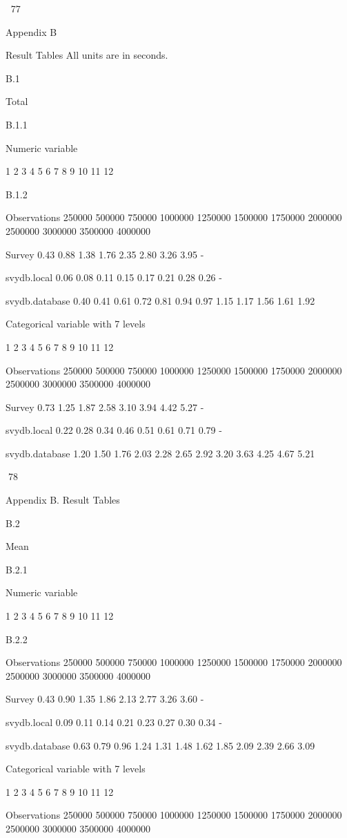 77

Appendix B

Result Tables
All units are in seconds.

B.1

Total

B.1.1

Numeric variable

1
2
3
4
5
6
7
8
9
10
11
12

B.1.2

Observations
250000
500000
750000
1000000
1250000
1500000
1750000
2000000
2500000
3000000
3500000
4000000

Survey
0.43
0.88
1.38
1.76
2.35
2.80
3.26
3.95
-

svydb.local
0.06
0.08
0.11
0.15
0.17
0.21
0.28
0.26
-

svydb.database
0.40
0.41
0.61
0.72
0.81
0.94
0.97
1.15
1.17
1.56
1.61
1.92

Categorical variable with 7 levels

1
2
3
4
5
6
7
8
9
10
11
12

Observations
250000
500000
750000
1000000
1250000
1500000
1750000
2000000
2500000
3000000
3500000
4000000

Survey
0.73
1.25
1.87
2.58
3.10
3.94
4.42
5.27
-

svydb.local
0.22
0.28
0.34
0.46
0.51
0.61
0.71
0.79
-

svydb.database
1.20
1.50
1.76
2.03
2.28
2.65
2.92
3.20
3.63
4.25
4.67
5.21

78

Appendix B. Result Tables

B.2

Mean

B.2.1

Numeric variable

1
2
3
4
5
6
7
8
9
10
11
12

B.2.2

Observations
250000
500000
750000
1000000
1250000
1500000
1750000
2000000
2500000
3000000
3500000
4000000

Survey
0.43
0.90
1.35
1.86
2.13
2.77
3.26
3.60
-

svydb.local
0.09
0.11
0.14
0.21
0.23
0.27
0.30
0.34
-

svydb.database
0.63
0.79
0.96
1.24
1.31
1.48
1.62
1.85
2.09
2.39
2.66
3.09

Categorical variable with 7 levels

1
2
3
4
5
6
7
8
9
10
11
12

Observations
250000
500000
750000
1000000
1250000
1500000
1750000
2000000
2500000
3000000
3500000
4000000


